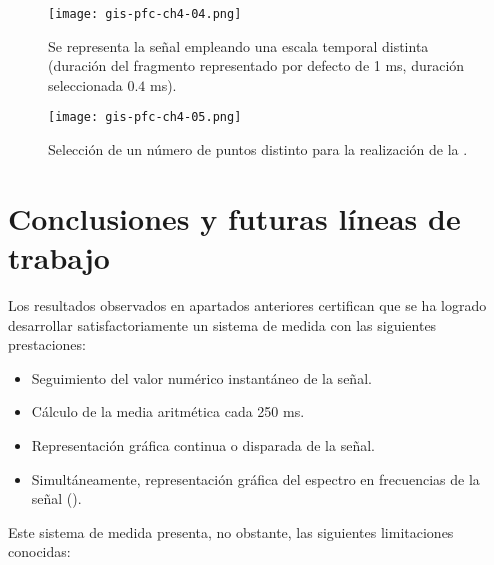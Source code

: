 \begin{figure}[p]
    \begin{center}
	\texttt{[image: gis-pfc-ch4-04.png]}
    \end{center}
    \caption[Selección de otra escala temporal]{Se representa la señal
    empleando una escala temporal distinta (duración del fragmento
    representado por defecto de 1 ms, duración seleccionada $0.4$ ms).}
    \label{fig:scaled}
\end{figure}

\begin{figure}[p]
    \begin{center}
	\texttt{[image: gis-pfc-ch4-05.png]}
    \end{center}
    \caption[Selección de un número de puntos distinto para la realización
    de la ]{Selección de un número de puntos distinto para la
    realización de la .}
    \label{fig:point-number}
\end{figure}


\section{Conclusiones y futuras líneas de trabajo}

Los resultados observados en apartados anteriores certifican que se ha
logrado desarrollar satisfactoriamente un sistema de medida con las
siguientes prestaciones:

\begin{itemize}
    \item Seguimiento del valor numérico instantáneo de la señal.
    \item Cálculo de la media aritmética cada 250 ms.
    \item Representación gráfica continua o disparada de la señal.
    \item Simultáneamente, representación gráfica del espectro en
	frecuencias de la señal ().
\end{itemize}

Este sistema de medida presenta, no obstante, las siguientes limitaciones
conocidas:

